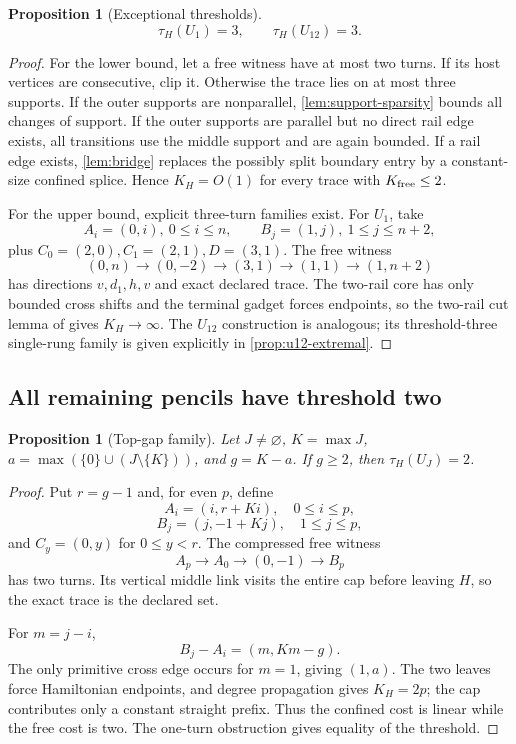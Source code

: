 \documentclass[11pt]{article}
\newtheorem{proposition}[theorem]{Proposition}
\theoremstyle{definition}
\begin{document}
\begin{proposition}[Exceptional thresholds]\label{prop:exceptional-thresholds}
\[
\boxed{\tau_H(U_1)=3,\qquad \tau_H(U_{12})=3.}
\]
\end{proposition}
\begin{proof}
For the lower bound, let a free witness have at most two turns.  If its host vertices are consecutive, clip it.  Otherwise the trace lies on at most three supports.  If the outer supports are nonparallel, \cref{lem:support-sparsity} bounds all changes of support.  If the outer supports are parallel but no direct rail edge exists, all transitions use the middle support and are again bounded.  If a rail edge exists, \cref{lem:bridge} replaces the possibly split boundary entry by a constant-size confined splice.  Hence $K_H=O(1)$ for every trace with $K_{\rm free}\le2$.

For the upper bound, explicit three-turn families exist.  For $U_1$, take
\[
A_i=(0,i),\ 0\le i\le n,
\qquad B_j=(1,j),\ 1\le j\le n+2,
\]
plus $C_0=(2,0),C_1=(2,1),D=(3,1)$.  The free witness
\[
(0,n)\to(0,-2)\to(3,1)\to(1,1)\to(1,n+2)
\]
has directions $v,d_1,h,v$ and exact declared trace.  The two-rail core has only bounded cross shifts and the terminal gadget forces endpoints, so the two-rail cut lemma of \cite{RosalesPaperIIII} gives $K_H\to\infty$.  The $U_{12}$ construction is analogous; its threshold-three single-rung family is given explicitly in \cref{prop:u12-extremal}.
\end{proof}

\subsection{All remaining pencils have threshold two}
\begin{proposition}[Top-gap family]\label{prop:top-gap}
Let $J\ne\varnothing$, $K=\max J$, $a=\max(\{0\}\cup(J\setminus\{K\}))$, and $g=K-a$.  If $g\ge2$, then $\tau_H(U_J)=2$.
\end{proposition}
\begin{proof}
Put $r=g-1$ and, for even $p$, define
\[
A_i=(i,r+Ki),\quad0\le i\le p,
\]
\[
B_j=(j,-1+Kj),\quad1\le j\le p,
\]
and $C_y=(0,y)$ for $0\le y<r$.  The compressed free witness
\[
A_p\to A_0\to(0,-1)\to B_p
\]
has two turns.  Its vertical middle link visits the entire cap before leaving $H$, so the exact trace is the declared set.

For $m=j-i$,
\[
B_j-A_i=(m,Km-g).
\]
The only primitive cross edge occurs for $m=1$, giving $(1,a)$.  The two leaves force Hamiltonian endpoints, and degree propagation gives $K_H=2p$; the cap contributes only a constant straight prefix.  Thus the confined cost is linear while the free cost is two.  The one-turn obstruction gives equality of the threshold.
\end{proof}
\end{document}
